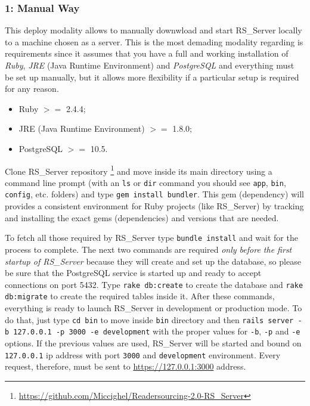 \documentclass[a4paper, english]{article}
\newcounter{subsubsubsection}[subsubsection]
\begin{document}
\subsubsection{1: Manual Way}

\label{deploy1}

This deploy modality allows to manually downwload and start RS\_Server locally to a machine chosen as a server. This is the most demading modality regarding is requirements since it assumes that you have a full and working installation of \emph{Ruby}, \emph{JRE} (Java Runtime Environment) and \emph{PostgreSQL} and everything must be set up manually, but it allows more flexibility if a particular setup is required for any reason. 


\begin{itemize}
\item Ruby $>=$ 2.4.4;
\item JRE (Java Runtime Environment) $>=$ 1.8.0;
\item PostgreSQL $>=$ 10.5.
\end{itemize}


Clone RS\_Server repository \footnote{\url{https://github.com/Miccighel/Readersourcing-2.0-RS_Server}} and move inside its main directory using a command line prompt (with an \verb|ls| or \verb|dir| command you should see \verb|app|, \verb|bin|, \verb|config|, etc. folders) and type \verb|gem install bundler|. This gem (dependency) will provides a consistent environment for Ruby projects (like RS\_Server) by tracking and installing the exact gems (dependencies) and versions that are needed. 

To fetch all those required by RS\_Server type \verb|bundle install| and wait for the process to complete. The next two commands are required \emph{only before the first startup of RS\_Server} because they will create and set up the database, so please be sure that the PostgreSQL service is started up and ready to accept connections on port 5432. Type \verb|rake db:create| to create the database and \verb|rake db:migrate| to create the required tables inside it. After these commands, everything is ready to launch RS\_Server in development or production mode. To do that, just type \verb|cd bin| to move inside \verb|bin| directory and then \verb|rails server -b 127.0.0.1 -p 3000 -e development| with the proper values for \verb|-b|, \verb|-p| and \verb|-e| options. If the previous values are used, RS\_Server will be started and bound on \verb|127.0.0.1| ip address with port \verb|3000| and \verb|development| environment. Every request, therefore, must be sent to \url{https://127.0.0.1:3000} address.
\end{document}
